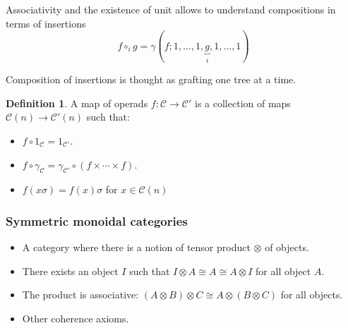 \documentclass{beamer}
\theoremstyle{definition}
\newtheorem{defi}{Definition}
\newcommand{\CC}{\mathcal{C}}
\begin{document}
\begin{frame}
	Associativity and the existence of unit allows to understand compositions in terms of insertions $$f\circ_i g=\gamma(f;1,\dots, 1,\underbrace{g}_{i},1,\dots, 1)$$ \pause
	
	Composition of insertions is thought as grafting one tree at a time.
\end{frame}
\begin{frame}
	\begin{defi}
	 A map of operads $f:\mathcal{C}\to \mathcal{C}'$ is a collection of maps $\mathcal{C}(n)\to \mathcal{C}'(n)$ such that:
		\begin{itemize}
			\item<1->   $f\circ 1_\mathcal{C}=1_{\mathcal{C}'}$.
			\item<2->  $f\circ \gamma_\mathcal{C}=\gamma_{\mathcal{C}'}\circ (f\times\cdots\times f)$.
			\item<3->   $f(x\sigma)=f(x)\sigma$ for $x\in\CC(n)$
		\end{itemize}
	\end{defi}
	
	
\end{frame}
\begin{frame}
	\frametitle{Symmetric monoidal  categories}
	\begin{itemize}
		\item<1-> A category where there is a notion of tensor product $\otimes $ of objects.
		\item<2-> There exists an object $I$ such that $I\otimes A\cong A\cong A\otimes I$ for all object $A$.
		\item<3-> The product is associative: $(A\otimes B)\otimes C\cong A\otimes (B\otimes C)$ for all objects.
		\item<4-> Other coherence axioms.
	\end{itemize}
	
\end{frame}
\end{document}
